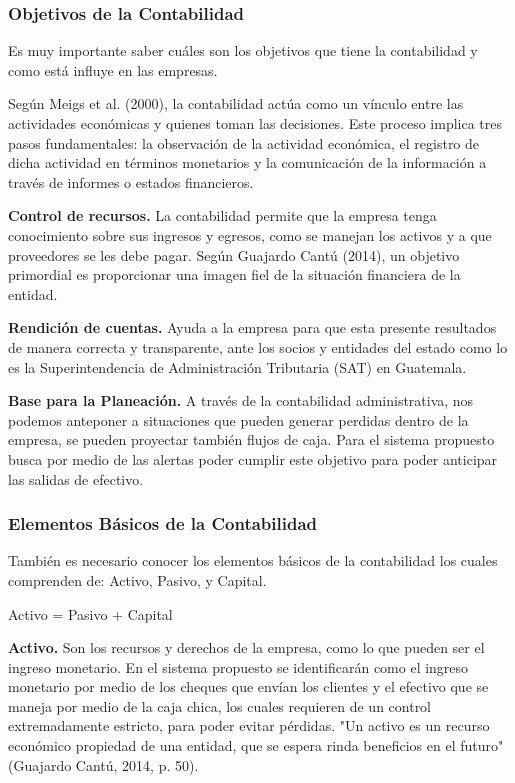 \subsubsection{Objetivos de la Contabilidad}

Es muy importante saber cuáles son los objetivos que tiene la contabilidad y como está influye en las empresas.

Según Meigs et al. (2000), la contabilidad actúa como un vínculo entre las actividades económicas y quienes toman las decisiones. Este proceso implica tres pasos fundamentales: la observación de la actividad económica, el registro de dicha actividad en términos monetarios y la comunicación de la información a través de informes o estados financieros.

\textbf{Control de recursos.} La contabilidad permite que la empresa tenga conocimiento sobre sus ingresos y egresos, como se manejan los activos y a que proveedores se les debe pagar. Según Guajardo Cantú (2014), un objetivo primordial es proporcionar una imagen fiel de la situación financiera de la entidad.

\textbf{Rendición de cuentas.} Ayuda a la empresa para que esta presente resultados de manera correcta y transparente, ante los socios y entidades del estado como lo es la Superintendencia de Administración Tributaria (SAT) en Guatemala.

\textbf{Base para la Planeación.} A través de la contabilidad administrativa, nos podemos anteponer a situaciones que pueden generar perdidas dentro de la empresa, se pueden proyectar también flujos de caja. Para el sistema propuesto busca por medio de las alertas poder cumplir este objetivo para poder anticipar las salidas de efectivo.

\subsubsection{Elementos Básicos de la Contabilidad}

También es necesario conocer los elementos básicos de la contabilidad los cuales comprenden de: Activo, Pasivo, y Capital.

Activo = Pasivo + Capital

\textbf{Activo.} Son los recursos y derechos de la empresa, como lo que pueden ser el ingreso monetario. En el sistema propuesto se identificarán como el ingreso monetario por medio de los cheques que envían los clientes y el efectivo que se maneja por medio de la caja chica, los cuales requieren de un control extremadamente estricto, para poder evitar pérdidas. "Un activo es un recurso económico propiedad de una entidad, que se espera rinda beneficios en el futuro" (Guajardo Cantú, 2014, p. 50).


